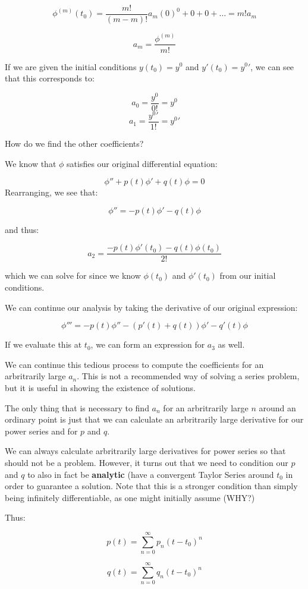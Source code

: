 \documentclass{report}
\begin{document}
$$\phi^{(m)}(t_0) = \frac{m!}{(m-m)!}a_m(0)^{0} + 0 + 0 + \dots = m!a_m$$

$$a_m = \frac{\phi^{(m)}}{m!}$$

If we are given the initial conditions $y(t_0) = y^0$ and $y'(t_0) = y^0'$, we can see that this corresponds to:

$$a_0 = \frac{y^0}{0!} = y^0$$
$$a_1 = \frac{y^0'}{1!} = y^0'$$

How do we find the other coefficients?

We know that $\phi$ satisfies our original differential equation:

$$\phi'' + p(t)\phi' + q(t)\phi = 0$$
Rearranging, we see that:

$$\phi'' = - p(t)\phi' - q(t)\phi$$

and thus:

$$a_2 = \frac{- p(t)\phi'(t_0) - q(t)\phi(t_0)}{2!}$$

which we can solve for since we know $\phi(t_0)$ and $\phi'(t_0)$ from our initial conditions.

We can continue our analysis by taking the derivative of our original expression:

$$\phi''' = - p(t)\phi'' - (p'(t) + q(t))\phi' - q'(t)\phi$$

If we evaluate this at $t_0$, we can form an expression for $a_3$ as well.

We can continue this tedious process to compute the coefficients for an arbritrarily large $a_n$. This is not a recommended way of solving a series problem, but it is useful in showing the existence of solutions.

The only thing that is necessary to find $a_n$ for an arbritrarily large $n$ around an ordinary point is just that we can calculate an arbritrarily large derivative for our power series and for $p$ and $q$. 


We can always calculate arbritrarily large derivatives for power series so that should not be a problem. However, it turns out that we need to condition our $p$ and $q$ to also in fact be \textbf{analytic} (have a convergent Taylor Series around $t_0$ in order to guarantee a solution. Note that this is a stronger condition than simply being infinitely differentiable, as one might initially assume (WHY?)

Thus:

$$
p(t) = \sum_{n=0}^{\infty}p_n(t-t_0)^n
$$

$$
q(t) = \sum_{n=0}^{\infty}q_n(t-t_0)^n
$$
\end{document}
